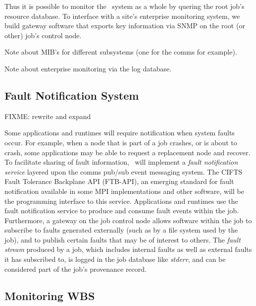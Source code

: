 Thus it is possible to monitor the \ngrm\ system as a whole by quering
the root job's resource database.  To interface with a site's enterprise
monitoring system, we build gateway software that exports key information
via SNMP on the root (or other) job's control node.

Note about MIB's for different subsystems (one for the comms for example).

Note about enterprise monitoring via the log database.

\subsection{Fault Notification System}

FIXME: rewrite and expand

Some applications and runtimes will require notification when system faults
occur.  For example, when a node that is part of a job crashes, or is about to
crash, some applications may be able to request a replacement node and recover.
To facilitate sharing of fault information, \ngrm\ will implement a
{\em fault notification service} layered upon the comms pub/sub event
messaging system.
The CIFTS Fault Tolerance Backplane API\cite{FTBAPI} (FTB-API), an emerging
standard for fault notification available in some MPI implementations and
other software, will be the programming interface to this service.
Applications and runtimes use the fault notification service to produce
and consume fault events within the job.  Furthermore, a gateway on the
job control node allows software within the job to subscribe to faults
generated externally (such as by a file system used by the job), and to
publish certain faults that may be of interest to others.
The {\em fault stream} produced by a job, which includes internal faults
as well as external faults it has subscribed to, is logged in the job database
like {\em stderr}, and can be considered part of the job's provenance record.

\subsection{Monitoring WBS}

